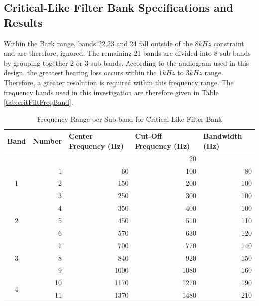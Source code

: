 \documentclass[11pt,onecolumn]{witseiepaper}
\begin{document}
\begin{appendices}
\section{Critical-Like Filter Bank Specifications and Results}
\label{app:critFiltFreqBand}

\noindent Within the Bark range, bands 22,23 and 24 fall outside of the $8kHz$ constraint and are therefore, ignored. The remaining 21 bands are divided into 8 sub-bands by grouping together 2 or 3 sub-bands. According to the audiogram used in this design, the greatest hearing loss occurs within the $1kHz$ to $3kHz$ range. Therefore, a greater resolution is required within this frequency range. The frequency bands used in this investigation are therefore given in Table \ref{tab:critFiltFreqBand}.

\begin{table}[htbp]
  \centering
  \caption{Frequency Range per Sub-band for Critical-Like Filter Bank}
  \begin{adjustbox}{width=0.9\linewidth}
    \begin{tabular}{|c|r|r|r|r|}
    \hline
    \multicolumn{1}{|l|}{\textbf{Band}} & \multicolumn{1}{l|}{\textbf{Number}} & \multicolumn{1}{l|}{\textbf{Center Frequency (Hz) }} & \multicolumn{1}{l|}{\textbf{Cut-Off Frequency (Hz)}} & \multicolumn{1}{l|}{\textbf{Bandwidth (Hz)}} \\
    \hline
          &       &       & 20    &  \\
    \hline
    \multirow{3}[6]{*}{1} & 1     & 60    & 100   & 80 \\
\cline{2-5}          & 2     & 150   & 200   & 100 \\
\cline{2-5}          & 3     & 250   & 300   & 100 \\
    \hline
    \multirow{3}[6]{*}{2} & 4     & 350   & 400   & 100 \\
\cline{2-5}          & 5     & 450   & 510   & 110 \\
\cline{2-5}          & 6     & 570   & 630   & 120 \\
    \hline
    \multirow{3}[6]{*}{3} & 7     & 700   & 770   & 140 \\
\cline{2-5}          & 8     & 840   & 920   & 150 \\
\cline{2-5}          & 9     & 1000  & 1080  & 160 \\
    \hline
    \multirow{2}[4]{*}{4} & 10    & 1170  & 1270  & 190 \\
\cline{2-5}          & 11    & 1370  & 1480  & 210 \\

\end{tabular}
\end{adjustbox}
\end{table}
\end{appendices}
\end{document}
